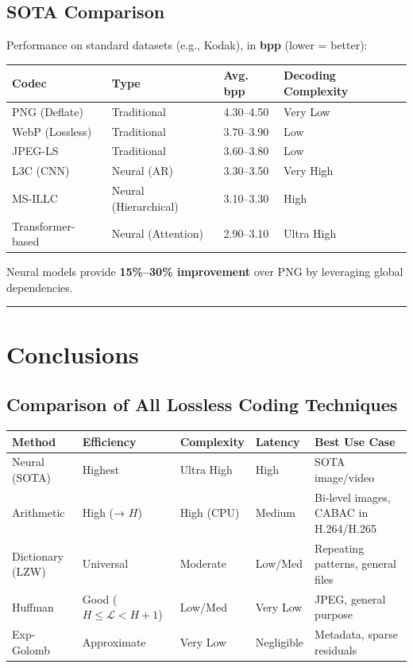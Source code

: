 \subsection{SOTA Comparison}

Performance on standard datasets (e.g., Kodak), in \textbf{bpp} (lower = better):

\begin{center}
\begin{tabular}{|l|l|l|l|}
\hline
\textbf{Codec} & \textbf{Type} & \textbf{Avg. bpp} & \textbf{Decoding Complexity} \\ \hline
PNG (Deflate) & Traditional & 4.30–4.50 & Very Low \\ \hline
WebP (Lossless) & Traditional & 3.70–3.90 & Low \\ \hline
JPEG-LS & Traditional & 3.60–3.80 & Low \\ \hline
L3C (CNN) & Neural (AR) & 3.30–3.50 & Very High \\ \hline
MS-ILLC & Neural (Hierarchical) & 3.10–3.30 & High \\ \hline
Transformer-based & Neural (Attention) & 2.90–3.10 & Ultra High \\ \hline
\end{tabular}
\end{center}

Neural models provide \textbf{15\%–30\% improvement} over PNG by leveraging global dependencies.

\bigskip\hrule\bigskip

\section{Conclusions}

\subsection{Comparison of All Lossless Coding Techniques}

\begin{center}
\begin{tabular}{|l|l|l|l|l|}
\hline
\textbf{Method} & \textbf{Efficiency} & \textbf{Complexity} & \textbf{Latency} & \textbf{Best Use Case} \\ \hline
Neural (SOTA) & Highest & Ultra High & High & SOTA image/video \\ \hline
Arithmetic & High (→ $H$) & High (CPU) & Medium & Bi-level images, CABAC in H.264/H.265 \\ \hline
Dictionary (LZW) & Universal & Moderate & Low/Med & Repeating patterns, general files \\ \hline
Huffman & Good ($H \leq \mathcal{L} < H+1$) & Low/Med & Very Low & JPEG, general purpose \\ \hline
Exp-Golomb & Approximate & Very Low & Negligible & Metadata, sparse residuals \\ \hline
\end{tabular}
\end{center}

